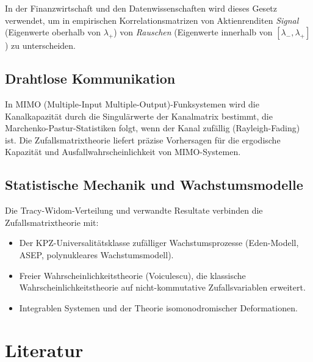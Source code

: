\documentclass[12pt,a4paper]{amsart}
\theoremstyle{definition}
\theoremstyle{remark}
\begin{document}
In der Finanzwirtschaft und den Datenwissenschaften wird dieses Gesetz verwendet,
um in empirischen Korrelationsmatrizen von Aktienrenditen \emph{Signal}
(Eigenwerte oberhalb von $\lambda_+$) von \emph{Rauschen} (Eigenwerte innerhalb
von $[\lambda_-, \lambda_+]$) zu unterscheiden.

\subsection{Drahtlose Kommunikation}

In MIMO (Multiple-Input Multiple-Output)-Funksystemen wird die Kanalkapazität
durch die Singulärwerte der Kanalmatrix bestimmt, die Marchenko-Pastur-Statistiken
folgt, wenn der Kanal zufällig (Rayleigh-Fading) ist. Die Zufallsmatrixtheorie
liefert präzise Vorhersagen für die ergodische Kapazität und
Ausfallwahrscheinlichkeit von MIMO-Systemen.

\subsection{Statistische Mechanik und Wachstumsmodelle}

Die Tracy-Widom-Verteilung und verwandte Resultate verbinden die
Zufallsmatrixtheorie mit:
\begin{itemize}
  \item Der KPZ-Universalitätsklasse zufälliger Wachstumsprozesse (Eden-Modell,
    ASEP, polynukleares Wachstumsmodell).
  \item Freier Wahrscheinlichkeitstheorie (Voiculescu), die klassische
    Wahrscheinlichkeitstheorie auf nicht-kommutative Zufallsvariablen erweitert.
  \item Integrablen Systemen und der Theorie isomonodromischer Deformationen.
\end{itemize}

\section{Literatur}
\label{sec:literatur}
\end{document}
